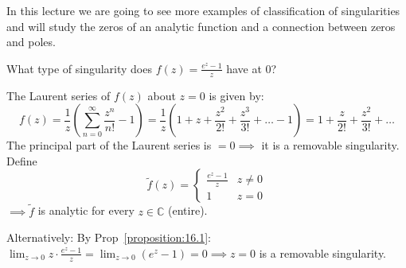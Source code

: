 
% 
% 
% 
% 
% 
% 
% 
% 
% 
% 
% 

\graphicspath{{./input/graphs/note08/}}


% 



In this lecture we are going to see more examples of classification of singularities and will study the zeros of an analytic function and a connection between zeros and poles.

\begin{example} \label{example:18.4} What type of singularity does $f(z) = \frac{e^z - 1}{z}$ have at 0?
\begin{soln}
    
    The Laurent series of $f(z)$ about $z=0$ is given by:
    \[ f(z) = \frac{1}{z} \left( \sum_{n=0}^{\infty} \frac{z^n}{n!} - 1 \right) = \frac{1}{z} \left( 1 + z + \frac{z^2}{2!} + \frac{z^3}{3!} + \dots - 1 \right) = 1 + \frac{z}{2!} + \frac{z^2}{3!} + \dots \]
    The principal part of the Laurent series is $= 0 \implies$ it is a removable singularity. Define 
    \[ \tilde{f}(z) = \begin{cases} \frac{e^z - 1}{z} & z \neq 0 \\ 1 & z = 0 \end{cases}\] 
    $ \implies \tilde{f}$ is analytic for every $z \in \mathbb{C}$ (entire).
\end{soln}
\end{example}

Alternatively: By Prop~\ref{proposition:16.1}: $\lim_{z \to 0} z \cdot \frac{e^z - 1}{z} = \lim_{z \to 0} (e^z - 1) = 0 \implies z = 0$ is a removable singularity.

